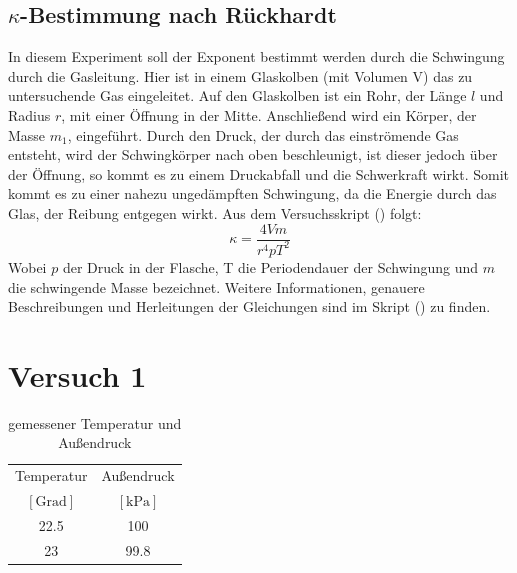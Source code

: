 \documentclass[bibliography=totocnumbered]{scrartcl}
\begin{document}
	\subsection{$\kappa$-Bestimmung nach Rückhardt}
	In diesem Experiment  soll der Exponent bestimmt werden durch die Schwingung durch die Gasleitung. Hier ist in einem Glaskolben (mit Volumen V) das zu untersuchende Gas eingeleitet. Auf den Glaskolben ist ein Rohr, der Länge $ l $ und Radius $ r $, mit einer Öffnung in der Mitte. Anschließend wird ein Körper, der Masse $ m_{1} $, eingeführt. Durch den Druck, der durch das einströmende Gas entsteht, wird der Schwingkörper nach oben beschleunigt, ist dieser jedoch über der Öffnung, so kommt es zu einem Druckabfall und die Schwerkraft wirkt. Somit kommt es zu einer nahezu ungedämpften Schwingung, da die Energie durch das Glas, der Reibung entgegen wirkt. Aus dem Versuchsskript (\cite{T7}) folgt:
	\begin{equation}\label{eq: kappa eq Rückhardt}
		\kappa= \dfrac{4Vm}{r^{4}p T^{2}}
	\end{equation}
	Wobei $p $ der Druck in der Flasche, T die Periodendauer der Schwingung und $ m $ die schwingende Masse bezeichnet. Weitere Informationen, genauere Beschreibungen und Herleitungen der Gleichungen sind im Skript (\cite{T7}) zu finden.
	
	\newpage
	\section{Versuch 1}
    \begin{table}[H]
        \centering
		\caption{gemessener Temperatur und Außendruck}
		\begin{tabular}{|c|c|}
			\hline
			Temperatur   & Außendruck \\
			$\left[\text{Grad}\right]$ & $\left[\text{kPa}\right]$ \\
			\hline
			22.5  & 100 \\
			\hline
			23 & 99.8 \\
			\hline
		\end{tabular}
	\label{tab: Temp und A.druck}
    \end{table}
	
\end{document}
